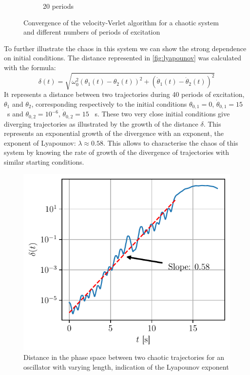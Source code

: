\begin{figure}[h]
\begin{subfigure}{0.48\linewidth}
        \caption{20 periods}
        \label{fig:chaos_20_per}
    \end{subfigure}
    \caption{Convergence of the velocity-Verlet algorithm for a chaotic system and different numbers of periods of excitation}
\end{figure}

To further illustrate the chaos in this system we can show the strong dependence on initial conditions. The distance represented in \autoref{fig:lyapounov} was calculated with the formula:
\begin{equation}
    \delta(t) = \sqrt{\omega_0^2(\theta_1(t) - \theta_2(t))^2 + (\dot\theta_1(t) - \dot\theta_2(t))^2}
\end{equation}
It represents a distance between two trajectories during 40 periods of excitation, $\theta_1$ and $\theta_2$, corresponding respectively to the initial conditions $\theta_{0,1} = 0$, $\dot\theta_{0,1} = 15$ \si{\per\second} and $\theta_{0,2} = 10^{-6}$, $\dot\theta_{0,2} = 15$ \si{\per\second}. These two very close initial conditions give diverging trajectories as illustrated by the growth of the distance $\delta$. This represents an exponential growth of the divergence with an exponent, the exponent of Lyapounov: $\lambda \approx 0.58$. This allows to characterise the chaos of this system by knowing the rate of growth of the divergence of trajectories with similar starting conditions.

\begin{figure}[H]
    \centering
    \includegraphics[width=0.6\linewidth]{figures/lyapounov.pdf}
    \caption{Distance in the phase space between two chaotic trajectories for an oscillator with varying length, indication of the Lyapounov exponent}
    \label{fig:lyapounov}
\end{figure}



